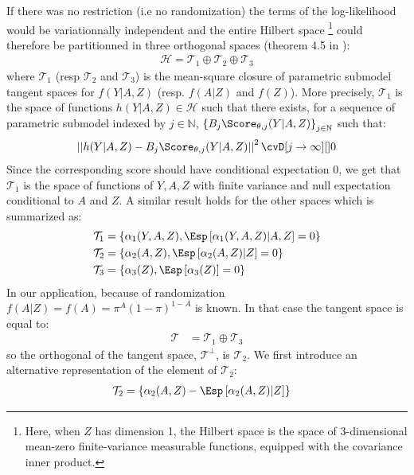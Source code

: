 \documentclass[12pt]{article}
\newcommand\Natural{\mathbb{N}}
\newcommand\Hspace{\mathcal{H}}
\newcommand\Tspace{\mathcal{T}}
\begin{document}
\bigskip

If there was no restriction (i.e no randomization) the terms of the
log-likelihood would be variationnally independent and the entire
Hilbert space \footnote{Here, when \(Z\) has dimension 1, the Hilbert space is the
space of 3-dimensional mean-zero finite-variance measurable functions,
equipped with the covariance inner product.} could therefore be partitionned in three orthogonal
spaces (theorem 4.5 in \cite{tsiatis2007semiparametric}):
\begin{align*}
\Hspace = \Tspace_1 \oplus \Tspace_2 \oplus \Tspace_3
\end{align*}
where \(\Tspace_1\) (resp \(\Tspace_2\) and \(\mathcal{T}_3\)) is the
mean-square closure of parametric submodel tangent spaces for
\(f(Y|A,Z)\) (resp. \(f(A|Z)\) and \(f(Z)\)). More precisely,
\(\Tspace_1\) is the space of functions \(h(Y|A,Z) \in \Hspace\) such
that there exists, for a sequence of parametric submodel indexed by
\(j\in \Natural\), \(\left\{B_j \Score_{\theta,j}(Y|A,Z)\right\}_{j\in
\Natural}\) such that:
\begin{align*}
\left|\left|h(Y|A,Z)-B_j \Score_{\theta,j}(Y|A,Z)\right|\right|^2 \cvD[j \rightarrow \infty][] 0
\end{align*}
Since the corresponding score should have conditional
expectation 0, we get that \(\Tspace_1\) is the space of functions of
\(Y,A,Z\) with finite variance and null expectation conditional to
\(A\) and \(Z\). A similar result holds for the other spaces which is
summarized as:
\begin{align*}
\Tspace_1 &= \left\{\alpha_1(Y,A,Z), \Esp\left[ \alpha_1(Y,A,Z) | A,Z \right] = 0 \right\} \\
\Tspace_2 &= \left\{\alpha_2(A,Z), \Esp\left[ \alpha_2(A,Z) | Z \right] = 0 \right\} \\
\Tspace_3 &= \left\{\alpha_3(Z), \Esp\left[ \alpha_3(Z) \right] = 0 \right\}
\end{align*}
In our application, because of randomization
\(f(A|Z)=f(A)=\pi^A(1-\pi)^{1-A}\) is known. In that case the tangent
space is equal to:
\begin{align*}
\Tspace &= \Tspace_1 \oplus \Tspace_3
\end{align*}
so the orthogonal of the tangent space, \(\Tspace^{\perp}\), is
\(\Tspace_2\). We first introduce an alternative representation of the element of \(\Tspace_2\):
\begin{align*}
\Tspace_2 &= \left\{\alpha_2(A,Z) - \Esp\left[ \alpha_2(A,Z) | Z \right] \right\} 
\end{align*}
\end{document}
